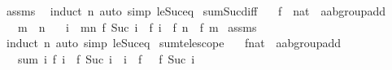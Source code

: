 \begin{isabellebody}
%
\isadelimproof
%
\endisadelimproof
%
\isatagproof
{}\isamarkupfalse%
\ assms\ \isamarkupfalse%
\ {\isacharparenleft}{\kern0pt}induct\ n{\isacharparenright}{\kern0pt}\ {\isacharparenleft}{\kern0pt}auto\ simp{\isacharcolon}{\kern0pt}\ le{\isacharunderscore}{\kern0pt}Suc{\isacharunderscore}{\kern0pt}eq{\isacharparenright}{\kern0pt}%
\endisatagproof
{\isafoldproof}%
%
\isadelimproof
\isanewline
%
\endisadelimproof
\isanewline
{}\isamarkupfalse%
\ sum{\isacharunderscore}{\kern0pt}Suc{\isacharunderscore}{\kern0pt}diff{\isacharprime}{\kern0pt}{\isacharcolon}{\kern0pt}\isanewline
\ \ \ f\ {\isacharcolon}{\kern0pt}{\isacharcolon}{\kern0pt}\ {\isachardoublequoteopen}nat\ {\isasymRightarrow}\ {\isacharprime}{\kern0pt}a{\isacharcolon}{\kern0pt}{\isacharcolon}{\kern0pt}ab{\isacharunderscore}{\kern0pt}group{\isacharunderscore}{\kern0pt}add{\isachardoublequoteclose}\isanewline
\ \ \ {\isachardoublequoteopen}m\ {\isasymle}\ n{\isachardoublequoteclose}\isanewline
\ \ \ {\isachardoublequoteopen}{\isacharparenleft}{\kern0pt}{\isasymSum}i\ {\isacharequal}{\kern0pt}\ m{\isachardot}{\kern0pt}{\isachardot}{\kern0pt}{\isacharless}{\kern0pt}n{\isachardot}{\kern0pt}\ f\ {\isacharparenleft}{\kern0pt}Suc\ i{\isacharparenright}{\kern0pt}\ {\isacharminus}{\kern0pt}\ f\ i{\isacharparenright}{\kern0pt}\ {\isacharequal}{\kern0pt}\ f\ n\ {\isacharminus}{\kern0pt}\ f\ m{\isachardoublequoteclose}\isanewline
%
\isadelimproof
%
\endisadelimproof
%
\isatagproof
{}\isamarkupfalse%
\ assms\ \isamarkupfalse%
\ {\isacharparenleft}{\kern0pt}induct\ n{\isacharparenright}{\kern0pt}\ {\isacharparenleft}{\kern0pt}auto\ simp{\isacharcolon}{\kern0pt}\ le{\isacharunderscore}{\kern0pt}Suc{\isacharunderscore}{\kern0pt}eq{\isacharparenright}{\kern0pt}%
\endisatagproof
{\isafoldproof}%
%
\isadelimproof
%
\endisadelimproof
%
\isadelimdocument
%
\endisadelimdocument
%
\isatagdocument
%
\isamarkuptrue%
%
\endisatagdocument
{\isafolddocument}%
%
\isadelimdocument
%
\endisadelimdocument
{}\isamarkupfalse%
\ sum{\isacharunderscore}{\kern0pt}telescope{\isacharcolon}{\kern0pt}\isanewline
\ \ \ f{\isacharcolon}{\kern0pt}{\isacharcolon}{\kern0pt}{\isachardoublequoteopen}nat\ {\isasymRightarrow}\ {\isacharprime}{\kern0pt}a{\isacharcolon}{\kern0pt}{\isacharcolon}{\kern0pt}ab{\isacharunderscore}{\kern0pt}group{\isacharunderscore}{\kern0pt}add{\isachardoublequoteclose}\isanewline
\ \ \ {\isachardoublequoteopen}sum\ {\isacharparenleft}{\kern0pt}{\isasymlambda}i{\isachardot}{\kern0pt}\ f\ i\ {\isacharminus}{\kern0pt}\ f\ {\isacharparenleft}{\kern0pt}Suc\ i{\isacharparenright}{\kern0pt}{\isacharparenright}{\kern0pt}\ {\isacharbraceleft}{\kern0pt}{\isachardot}{\kern0pt}{\isachardot}{\kern0pt}\ i{\isacharbraceright}{\kern0pt}\ {\isacharequal}{\kern0pt}\ f\ {}\ {\isacharminus}{\kern0pt}\ f\ {\isacharparenleft}{\kern0pt}Suc\ i{\isacharparenright}{\kern0pt}{\isachardoublequoteclose}\isanewline

\end{isabellebody}
